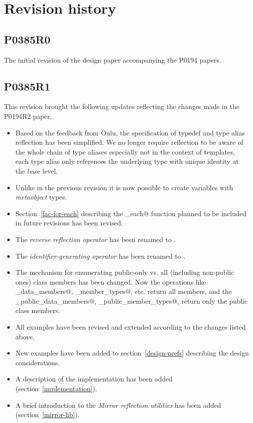 \section{Revision history}

\subsection{P0385R0}

The initial revision of the design paper accompanying the P0194 papers.

\subsection{P0385R1}

This revision brought the following updates reflecting
the changes made in the P0194R2 paper.

\begin{itemize}
\item Based on the feedback from Oulu, the specification of typedef and
type alias reflection has been simplified. We no longer require reflection
to be aware of the whole chain of type aliases especially not in the context
of templates, each type alias only references the underlying type with unique
identity at the base level.
\item Unlike in the previous revision it is now possible to create variables
with {\em metaobject} types.
\item Section~\ref{fac-for-each} describing the \verb@for_each@ function
planned to be included in future revisions has been revised.
\item The {\em reverse reflection operator} has been renamed to \verb@unreflexpr@.
\item The {\em identifier-generating operator} has been renamed to \verb@idreflexpr@.
\item The mechanism for enumerating public-only vs. all (including non-public ones)
class members has been changed. Now the  operations like
\verb@get_data_members@, \verb@get_member_types@, etc.
return all members, and the \verb@get_public_data_members@,
\verb@get_public_member_types@, return only the public class members.
\item All examples have been revised and extended according to the changes listed above.
\item New examples have been added to section~\ref{design-prefs} describing
the design considerations.
\item A description of the implementation has been added (section~\ref{implementation}).
\item A brief introduction to the {\em Mirror reflection utilities} has been added
(section~\ref{mirror-lib}).
\end{itemize}

